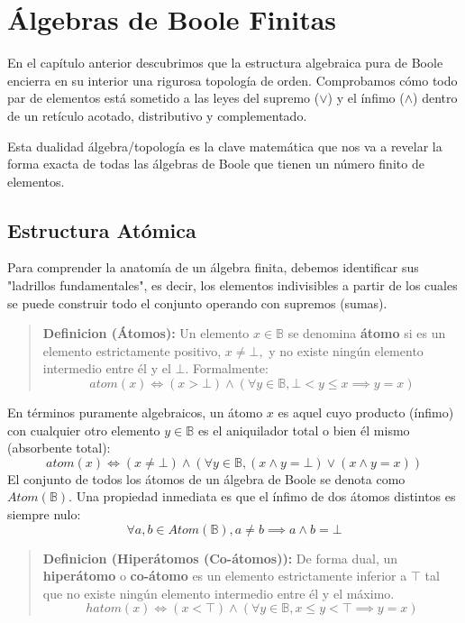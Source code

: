 \chapter{Álgebras de Boole Finitas}

En el capítulo anterior descubrimos que la estructura algebraica pura de Boole encierra en su interior una rigurosa topología de orden. Comprobamos cómo todo par de elementos está sometido a las leyes del supremo ($\vee$) y el ínfimo ($\wedge$) dentro de un retículo acotado, distributivo y complementado.

Esta dualidad álgebra/topología es la clave matemática que nos va a revelar la forma exacta de todas las álgebras de Boole que tienen un número finito de elementos.

\section{Estructura Atómica}

Para comprender la anatomía de un álgebra finita, debemos identificar sus "ladrillos fundamentales", es decir, los elementos indivisibles a partir de los cuales se puede construir todo el conjunto operando con supremos (sumas).

\begin{quote}\textbf{Definicion (Átomos):}\label{atomos}
Un elemento $x \in \mathbb{B}$ se denomina \textbf{átomo} si es un elemento estrictamente positivo, $x \ne \bot,$ y no existe ningún elemento intermedio entre él y el $\bot.$ Formalmente:
\[ \mathit{atom}(x) \iff (x > \bot) \wedge \left( \forall y \in \mathbb{B}, \bot < y \le x \implies y = x \right) \]
\end{quote}

En términos puramente algebraicos, un átomo $x$ es aquel cuyo producto (ínfimo) con cualquier otro elemento $y \in \mathbb{B}$ es el aniquilador total o bien él mismo (absorbente total):
\[ \mathit{atom}(x) \iff (x \ne \bot) \wedge \left( \forall y \in \mathbb{B}, (x \wedge y = \bot) \vee (x \wedge y = x) \right) \]
El conjunto de todos los átomos de un álgebra de Boole se denota como $\mathit{Atom}(\mathbb{B}).$
Una propiedad inmediata es que el ínfimo de dos átomos distintos es siempre nulo:
\[ \forall a, b \in \mathit{Atom}(\mathbb{B}), a \ne b \implies a \wedge b = \bot \]

\begin{quote}\textbf{Definicion (Hiperátomos (Co-átomos)):}\label{hiperatomos}
De forma dual, un \textbf{hiperátomo} o \textbf{co-átomo} es un elemento estrictamente inferior a $\top$ tal que no existe ningún elemento intermedio entre él y el máximo.
\[ \mathit{hatom}(x) \iff (x < \top) \wedge \left( \forall y \in \mathbb{B}, x \le y < \top \implies y = x \right) \]
\end{quote}


